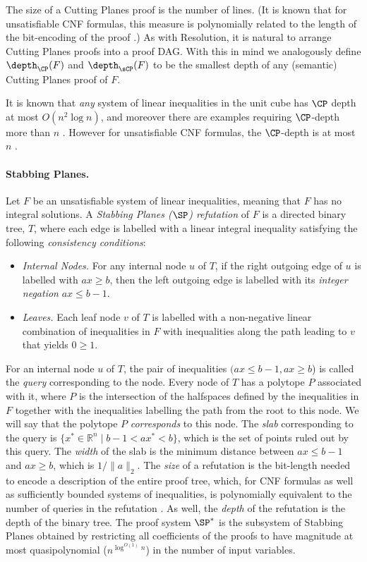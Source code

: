 \documentclass[11pt]{article}
\begin{document}
The size of a Cutting Planes proof is the number of lines.
%
%
(It is known that for   %
unsatisfiable CNF %
formulas,  %
this measure is polynomially related to the length of the bit-encoding of
the proof \cite{CookCT87}.)   %
As with Resolution, it is natural to arrange Cutting Planes proofs into a proof DAG.
With this in mind we analogously define $\depth_{\CP}(F)$ and $\depth_{\sCP}(F)$
to be the smallest depth of any (semantic) Cutting Planes proof of $F$. 

It is known that \emph{any} system of linear inequalities in the unit cube has $\CP$ depth at most
$O(n^2 \log n)$, and moreover there
are examples requiring $\CP$-depth more than $n$ \cite{EisenbrandS99}.
However for unsatisfiable CNF formulas,
the $\CP$-depth is at most $n$ \cite{BockmayrEHS99}.

\paragraph{Stabbing Planes.}
Let $F$ be an unsatisfiable system of linear inequalities, meaning that $F$ has no integral solutions.  %
%
%
%
A \emph{Stabbing Planes ($\SP$) refutation} of $F$ is a directed binary tree, $T$, where each edge is labelled with a linear integral inequality satisfying the following \emph{consistency conditions}:
\begin{itemize}
	\item \emph{Internal Nodes.} For any internal node $u$ of $T$, if the right outgoing edge of $u$ is labelled with $ax \geq b$, then the left outgoing edge is labelled with its \emph{integer negation} $ax \leq  b-1 $.
	\item \emph{Leaves.} Each leaf node $v$ of $T$ is labelled with a non-negative linear combination of inequalities in $F$ with inequalities along the path leading to $v$ that yields $0 \geq 1$.
\end{itemize}
For an internal node $u$ of $T$, the pair of inequalities $(ax \le b-1, ax \ge b$) is called the \emph{query} corresponding to the node. Every node of $T$ has a polytope $P$ associated with it, where $P$ is the
%
intersection of the halfspaces defined by the inequalities %
%
%
in $F$ together with the inequalities labelling the path from the root to this node. We will say that the polytope $P$ \emph{corresponds} to this node. 
The \emph{slab} corresponding to the query is $\{ x^* \in \mathbb{R}^n \mid b-1 < ax^* < b \}$, which is the set of points ruled out by this query. The \emph{width} of the slab is the minimum distance between $ax \leq b-1$ and $ax \geq b$, which is $1/\|a\|_2$.
The \emph{size} of a refutation is the bit-length needed to encode a description of the entire proof tree, which, for CNF formulas as well as sufficiently bounded systems of inequalities, is polynomially equivalent to the number of queries  in the refutation \cite{TseitinUpperBound}.
As well, the \emph{depth} of the refutation is the depth of the binary tree.
The proof system $\SP^*$ is the subsystem of Stabbing Planes obtained by restricting all coefficients of the proofs to have magnitude at most quasipolynomial ($n^{\log^{O(1)} n}$) in the number of input variables.
\end{document}
